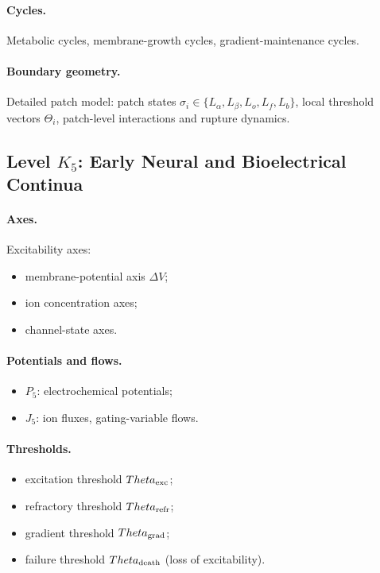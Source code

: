 \paragraph{Cycles.}
Metabolic cycles, membrane-growth cycles, gradient-maintenance cycles.

\paragraph{Boundary geometry.}
Detailed patch model:  
patch states \(\sigma_i\in\{L_\alpha,L_\beta,L_o,L_f,L_b\}\),
local threshold vectors \(\Theta_i\),
patch-level interactions and rupture dynamics.


\subsection{Level \texorpdfstring{\texorpdfstring{$K_5$}{K\_5}}{K5}: Early Neural and Bioelectrical Continua}

\paragraph{Axes.}
Excitability axes:
\begin{itemize}
    \item membrane-potential axis \(\Delta V\);
    \item ion concentration axes;
    \item channel-state axes.
\end{itemize}

\paragraph{Potentials and flows.}
\begin{itemize}
    \item \(P_5\): electrochemical potentials;
    \item \(J_5\): ion fluxes, gating-variable flows.
\end{itemize}

\paragraph{Thresholds.}
\begin{itemize}
    \item excitation threshold \(\Theta_{\rm exc}\);
    \item refractory threshold \(\Theta_{\rm refr}\);
    \item gradient threshold \(\Theta_{\rm grad}\);
    \item failure threshold \(\Theta_{\rm death}\) (loss of excitability).
\end{itemize}

